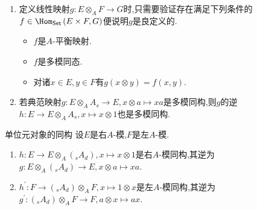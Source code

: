 \begin{remark}{}{}
	\begin{enumerate}
		\item 定义线性映射$g:E\otimes_{A}F\to G$时,只需要验证存在满足下列条件的$f\in\Hom_{\mathsf{Set}}\left(E\times F,G\right)$便说明$g$是良定义的.
		\begin{itemize}
			\item $f$是$A$-平衡映射.
			\item $f$是多模同态.
			\item 对诸$x\in E,y\in F$有$g\left(x\otimes y\right)=f\left(x,y\right)$.
		\end{itemize}
		\item 若典范映射$g:E\otimes_{A}A_{s}\to E,x\otimes a\mapsto xa$是多模同构,则$g$的逆$h:E\to E\otimes_{A}A_{s},x\mapsto x\otimes 1$也是多模同构.
	\end{enumerate}
\end{remark}

\begin{proposition}{单位元对象的同构}{}
	设$E$是右$A$-模,$F$是左$A$-模.
	\begin{enumerate}
		\item $h:E\to E\otimes_{A}\left(_{s}A_{d}\right),x\mapsto x\otimes 1$是右$A$-模同构,其逆为$g:E\otimes_{A}\left(_{s}A_{d}\right)\to E,x\otimes a\mapsto xa$.
		\item $h^{\prime}:F\to \left(_{s}A_{d}\right)\otimes_{A}F,x\mapsto 1\otimes x$是左$A$-模同构,其逆为$g^{\prime}:\left(_{s}A_{d}\right)\otimes_{A}F\to F,a\otimes x\mapsto ax$.
	\end{enumerate}
\end{proposition}


